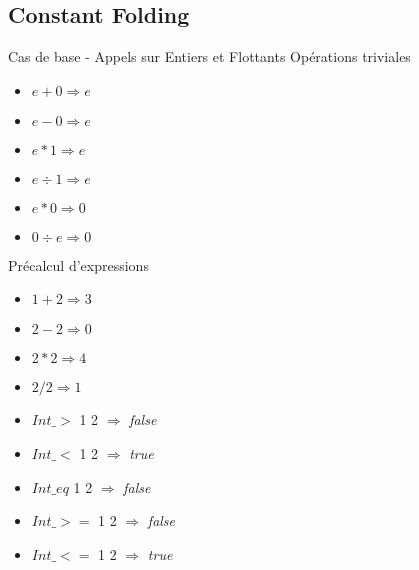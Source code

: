 \documentclass{beamer}
\begin{document}
\subsection{Constant Folding} 

\begin{frame}{Cas de base - Appels sur Entiers et Flottants}
Opérations triviales 
  \begin{multicols}{3}
  \begin{itemize}
    \item $e + 0 \Rightarrow e $
    \item $e - 0 \Rightarrow e $
    \item $e * 1 \Rightarrow e $
    \item $e \div 1 \Rightarrow e $
    \item $e * 0 \Rightarrow 0 $
    \item $0 \div e \Rightarrow 0 $
  \end{itemize}
  \end{multicols}

Précalcul d'expressions
  \begin{multicols}{2}
  \begin{itemize}
    \item $ 1 + 2 \Rightarrow 3 $
    \item $ 2 - 2 \Rightarrow 0 $
    \item $ 2 * 2 \Rightarrow 4 $
    \item $ 2 / 2 \Rightarrow 1 $
    \item $ Int\_>$ 1 2 $\Rightarrow$ \emph{false}
    \item $ Int\_<$ 1 2 $\Rightarrow$ \emph{true}
    \item $ Int\_eq$ 1 2 $\Rightarrow$ \emph{false}
    \item $ Int\_>=$ 1 2 $\Rightarrow$ \emph{false}
    \item $ Int\_<=$ 1 2 $\Rightarrow$ \emph{true}
  \end{itemize}
  \end{multicols}

\end{frame}
\end{document}
